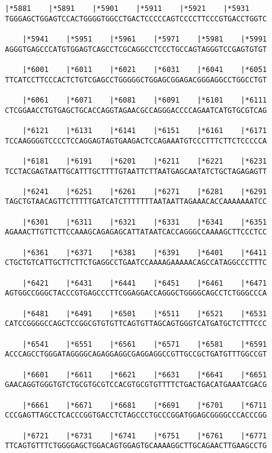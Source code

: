 \documentclass{article}
\begin{document}
\begin{Verbatim}[fontfamily=courier]
    |*5881    |*5891    |*5901    |*5911    |*5921    |*5931
TGGGAGCTGGAGTCCACTGGGGTGGCCTGACTCCCCCAGTCCCCTTCCCGTGACCTGGTC

    |*5941    |*5951    |*5961    |*5971    |*5981    |*5991
AGGGTGAGCCCATGTGGAGTCAGCCTCGCAGGCCTCCCTGCCAGTAGGGTCCGAGTGTGT

    |*6001    |*6011    |*6021    |*6031    |*6041    |*6051
TTCATCCTTCCCACTCTGTCGAGCCTGGGGGCTGGAGCGGAGACGGGAGGCCTGGCCTGT

    |*6061    |*6071    |*6081    |*6091    |*6101    |*6111
CTCGGAACCTGTGAGCTGCACCAGGTAGAACGCCAGGGACCCCAGAATCATGTGCGTCAG

    |*6121    |*6131    |*6141    |*6151    |*6161    |*6171
TCCAAGGGGTCCCCTCCAGGAGTAGTGAAGACTCCAGAAATGTCCCTTTCTTCTCCCCCA

    |*6181    |*6191    |*6201    |*6211    |*6221    |*6231
TCCTACGAGTAATTGCATTTGCTTTTGTAATTCTTAATGAGCAATATCTGCTAGAGAGTT

    |*6241    |*6251    |*6261    |*6271    |*6281    |*6291
TAGCTGTAACAGTTCTTTTTGATCATCTTTTTTTAATAATTAGAAACACCAAAAAAATCC

    |*6301    |*6311    |*6321    |*6331    |*6341    |*6351
AGAAACTTGTTCTTCCAAAGCAGAGAGCATTATAATCACCAGGGCCAAAAGCTTCCCTCC

    |*6361    |*6371    |*6381    |*6391    |*6401    |*6411
CTGCTGTCATTGCTTCTTCTGAGGCCTGAATCCAAAAGAAAAACAGCCATAGGCCCTTTC

    |*6421    |*6431    |*6441    |*6451    |*6461    |*6471
AGTGGCCGGGCTACCCGTGAGCCCTTCGGAGGACCAGGGCTGGGGCAGCCTCTGGGCCCA

    |*6481    |*6491    |*6501    |*6511    |*6521    |*6531
CATCCGGGGCCAGCTCCGGCGTGTGTTCAGTGTTAGCAGTGGGTCATGATGCTCTTTCCC

    |*6541    |*6551    |*6561    |*6571    |*6581    |*6591
ACCCAGCCTGGGATAGGGGCAGAGGAGGCGAGGAGGCCGTTGCCGCTGATGTTTGGCCGT

    |*6601    |*6611    |*6621    |*6631    |*6641    |*6651
GAACAGGTGGGTGTCTGCGTGCGTCCACGTGCGTGTTTTCTGACTGACATGAAATCGACG

    |*6661    |*6671    |*6681    |*6691    |*6701    |*6711
CCCGAGTTAGCCTCACCCGGTGACCTCTAGCCCTGCCCGGATGGAGCGGGGCCCACCCGG

    |*6721    |*6731    |*6741    |*6751    |*6761    |*6771
TTCAGTGTTTCTGGGGAGCTGGACAGTGGAGTGCAAAAGGCTTGCAGAACTTGAAGCCTG

\end{Verbatim}
\newpage
\end{document}
